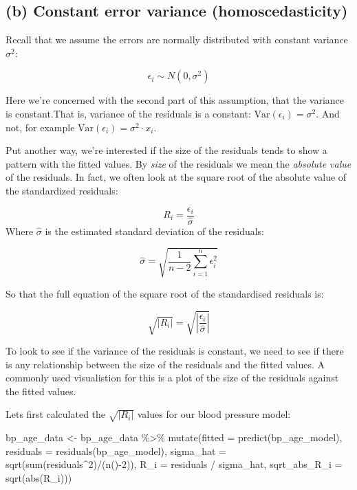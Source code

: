 \documentclass[
  letterpaper,
  8pt,
  a4paper]{book}
\newenvironment{Shaded}{\begin{snugshade}}{\end{snugshade}}
\newcommand{\AttributeTok}[1]{\textcolor[rgb]{0.40,0.45,0.13}{#1}}
\newcommand{\DecValTok}[1]{\textcolor[rgb]{0.68,0.00,0.00}{#1}}
\newcommand{\FunctionTok}[1]{\textcolor[rgb]{0.28,0.35,0.67}{#1}}
\newcommand{\NormalTok}[1]{\textcolor[rgb]{0.00,0.23,0.31}{#1}}
\newcommand{\OtherTok}[1]{\textcolor[rgb]{0.00,0.23,0.31}{#1}}
\newcommand{\SpecialCharTok}[1]{\textcolor[rgb]{0.37,0.37,0.37}{#1}}
\begin{document}
\subsection*{(b) Constant error variance
(homoscedasticity)}\label{b-constant-error-variance-homoscedasticity}

Recall that we assume the errors are normally distributed with constant
variance \(\sigma^2\):

\[\epsilon_i \sim N(0, \sigma^2)\]

Here we're concerned with the second part of this assumption, that the
variance is constant.That is, variance of the residuals is a constant:
\(\text{Var}(\epsilon_i) = \sigma^2\). And not, for example
\(\text{Var}(\epsilon_i) = \sigma^2 \cdot x_i\).

Put another way, we're interested if the size of the residuals tends to
show a pattern with the fitted values. By \emph{size} of the residuals
we mean the \emph{absolute value} of the residuals. In fact, we often
look at the square root of the absolute value of the standardized
residuals:

\[R_i = \frac{\epsilon_i}{\hat{\sigma}}\] Where \(\hat{\sigma}\) is the
estimated standard deviation of the residuals:

\[\hat{\sigma} = \sqrt{\frac{1}{n-2} \sum_{i=1}^n \epsilon_i^2}\]

So that the full equation of the square root of the standardised
residuals is:

\[\sqrt{|R_i|} = \sqrt{\left|\frac{\epsilon_i}{\hat{\sigma}}\right|}\]

To look to see if the variance of the residuals is constant, we need to
see if there is any relationship between the size of the residuals and
the fitted values. A commonly used visualistion for this is a plot of
the size of the residuals against the fitted values.

Lets first calculated the \(\sqrt{|R_i|}\) values for our blood pressure
model:

\begin{Shaded}
\begin{Highlighting}[]
\NormalTok{bp\_age\_data }\OtherTok{\textless{}{-}}\NormalTok{ bp\_age\_data }\SpecialCharTok{\%\textgreater{}\%}
  \FunctionTok{mutate}\NormalTok{(}\AttributeTok{fitted =} \FunctionTok{predict}\NormalTok{(bp\_age\_model),}
         \AttributeTok{residuals =} \FunctionTok{residuals}\NormalTok{(bp\_age\_model),}
         \AttributeTok{sigma\_hat =} \FunctionTok{sqrt}\NormalTok{(}\FunctionTok{sum}\NormalTok{(residuals}\SpecialCharTok{\^{}}\DecValTok{2}\NormalTok{)}\SpecialCharTok{/}\NormalTok{(}\FunctionTok{n}\NormalTok{()}\SpecialCharTok{{-}}\DecValTok{2}\NormalTok{)),}
         \AttributeTok{R\_i =}\NormalTok{ residuals }\SpecialCharTok{/}\NormalTok{ sigma\_hat,}
         \AttributeTok{sqrt\_abs\_R\_i =} \FunctionTok{sqrt}\NormalTok{(}\FunctionTok{abs}\NormalTok{(R\_i)))}
\end{Highlighting}
\end{Shaded}
\end{document}
